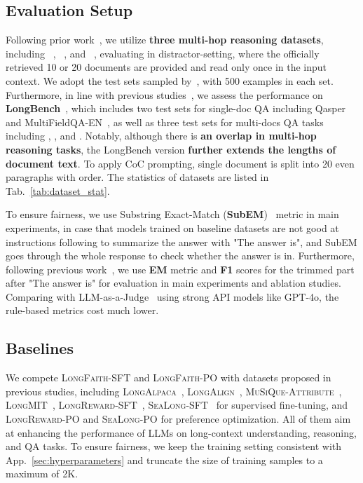 \subsection{Evaluation Setup}
Following prior work~\cite{coc}, we utilize \textbf{three multi-hop reasoning datasets}, including \musique~\cite{musique}, \twowiki~\cite{twowiki}, and \hotpot~\cite{hotpotqa}, evaluating in distractor-setting, where the officially retrieved 10 or 20 documents are provided and read only once in the input context. We adopt the test sets sampled by~\cite{multihopdatasets}, with 500 examples in each set. Furthermore, in line with previous studies~\cite{longmit, longreward, sealong}, we assess the performance on \textbf{LongBench}~\cite{longbench}, which includes two test sets for single-doc QA including Qasper~\cite{qasper} and MultiFieldQA-EN~\cite{longbench}, as well as three test sets for multi-docs QA tasks including \hotpot, \twowiki, and \musique. Notably, although there is \textbf{an overlap in multi-hop reasoning tasks}, the LongBench version \textbf{further extends the lengths of document text}. To apply CoC prompting, single document is split into 20 even paragraphs with order. The statistics of datasets are listed in Tab.~\ref{tab:dataset_stat}. 

To ensure fairness, we use Substring Exact-Match (\textbf{SubEM})~\cite{helmet, sealong} metric in main experiments, in case that models trained on baseline datasets are not good at instructions following to summarize the answer with "The answer is", and SubEM goes through the whole response to check whether the answer is in. Furthermore, following previous work~\cite{quac, retrieval, coc}, we use \textbf{EM} metric and \textbf{F1} scores for the trimmed part after "The answer is" for evaluation in main experiments and ablation studies. Comparing with LLM-as-a-Judge~\cite{longalign, longmit, longreward} using strong API models like GPT-4o, the rule-based metrics cost much lower.

\subsection{Baselines}
We compete \textsc{LongFaith}-SFT and \textsc{LongFaith}-PO with datasets proposed in previous studies, including \textsc{LongAlpaca}~\cite{longlora}, \textsc{LongAlign}~\cite{longalign}, \textsc{MuSiQue-Attribute}~\cite{coc}, \textsc{LongMIT}~\cite{longmit}, \textsc{LongReward}-SFT~\cite{longreward}, \textsc{SeaLong}-SFT~\cite{sealong} for supervised fine-tuning, and \textsc{LongReward}-PO and \textsc{SeaLong}-PO for preference optimization. All of them aim at enhancing the performance of LLMs on long-context understanding, reasoning, and QA tasks. To ensure fairness, we keep the training setting consistent with App.~\ref{sec:hyperparameters} and truncate the size of training samples to a maximum of 2K.

